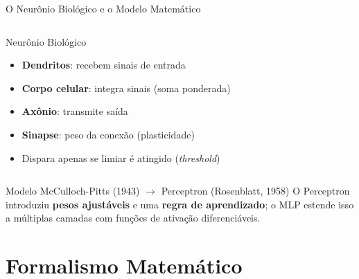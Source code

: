 \documentclass[7pt, aspectratio=169,10pt]{beamer}
\begin{document}
\begin{frame}{O Neurônio Biológico e o Modelo Matemático}
\begin{columns}[T]
\begin{block}{Neurônio Biológico}
\small
\begin{itemize}
  \item \textbf{Dendritos}: recebem sinais de entrada
  \item \textbf{Corpo celular}: integra sinais (soma ponderada)
  \item \textbf{Axônio}: transmite saída
  \item \textbf{Sinapse}: peso da conexão (plasticidade)
  \item Dispara apenas se limiar é atingido (\textit{threshold})
\end{itemize}
\end{block}
\end{columns}
\vspace{6pt}
\begin{alertblock}{Modelo McCulloch-Pitts (1943) $\to$ Perceptron (Rosenblatt, 1958)}
\small
O Perceptron introduziu \textbf{pesos ajustáveis} e uma \textbf{regra de aprendizado}; o MLP estende
isso a múltiplas camadas com funções de ativação diferenciáveis.
\end{alertblock}
\end{frame}

\section{Formalismo Matemático}
\end{document}
